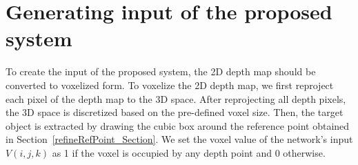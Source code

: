
\section{Generating input of the proposed system}

To create the input of the proposed system, the 2D depth map should be converted to voxelized form. To voxelize the 2D depth map, we first reproject each pixel of the depth map to the 3D space. After reprojecting all depth pixels, the 3D space is discretized based on the pre-defined voxel size. Then, the target object is extracted by drawing the cubic box around the reference point obtained in Section~\ref{refineRefPoint_Section}. We set the voxel value of the network's input $V(i,j,k)$ as 1 if the voxel is occupied by any depth point and 0 otherwise.
